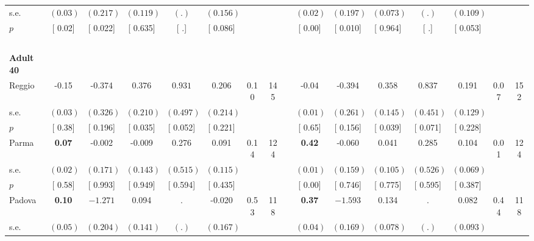 \begin{longtable}{L{8em} c c c c c c c p{1em} c c c c c c c}
\quad \quad \quad \quad s.e.& $ (     0.03)$ & $ (    0.217)$ & $ (    0.119)$ & $ (        .)$ & $ (    0.156)$ & & & & $ (     0.02)$ & $ (    0.197)$ & $ (    0.073)$ & $ (        .)$ & $ (    0.109)$ & &  \\*
\quad \quad \quad \quad $ p$ & [     0.02] & [    0.022] & [    0.635] & [        .] & [    0.086] & & & & [     0.00] & [    0.010] & [    0.964] & [        .] & [    0.053] & &  \\[1em]
~\\[1em]
\quad \quad \textbf{Adult 40} & & & & & & & & & & & & & & & \\* 
\quad \quad \quad Reggio& -0.15 &    -0.374 & $ \mathbf{    0.376}$ & $ \mathbf{    0.931}$ &     0.206 &      0.10 &       145 & & -0.04 &    -0.394 & $ \mathbf{    0.358}$ & $ \mathbf{    0.837}$ &     0.191 &      0.07 &       152  \\*
\quad \quad \quad \quad s.e.& $ (     0.03)$ & $ (    0.326)$ & $ (    0.210)$ & $ (    0.497)$ & $ (    0.214)$ & & & & $ (     0.01)$ & $ (    0.261)$ & $ (    0.145)$ & $ (    0.451)$ & $ (    0.129)$ & &  \\*
\quad \quad \quad \quad $ p$ & [     0.38] & [    0.196] & [    0.035] & [    0.052] & [    0.221] & & & & [     0.65] & [    0.156] & [    0.039] & [    0.071] & [    0.228] & &  \\[1em]
\quad \quad \quad Parma& \textbf{     0.07} &    -0.002 &    -0.009 &     0.276 &     0.091 &      0.14 &       124 & & \textbf{     0.42} &    -0.060 &     0.041 &     0.285 &     0.104 &      0.01 &       124  \\*
\quad \quad \quad \quad s.e.& $ (     0.02)$ & $ (    0.171)$ & $ (    0.143)$ & $ (    0.515)$ & $ (    0.115)$ & & & & $ (     0.01)$ & $ (    0.159)$ & $ (    0.105)$ & $ (    0.526)$ & $ (    0.069)$ & &  \\*
\quad \quad \quad \quad $ p$ & [     0.58] & [    0.993] & [    0.949] & [    0.594] & [    0.435] & & & & [     0.00] & [    0.746] & [    0.775] & [    0.595] & [    0.387] & &  \\[1em]
\quad \quad \quad Padova& \textbf{     0.10} & $ \mathbf{   -1.271}$ &     0.094 &         . &    -0.020 &      0.53 &       118 & & \textbf{     0.37} & $ \mathbf{   -1.593}$ &     0.134 &         . &     0.082 &      0.44 &       118  \\*
\quad \quad \quad \quad s.e.& $ (     0.05)$ & $ (    0.204)$ & $ (    0.141)$ & $ (        .)$ & $ (    0.167)$ & & & & $ (     0.04)$ & $ (    0.169)$ & $ (    0.078)$ & $ (        .)$ & $ (    0.093)$ & &  \\*

\end{longtable}
